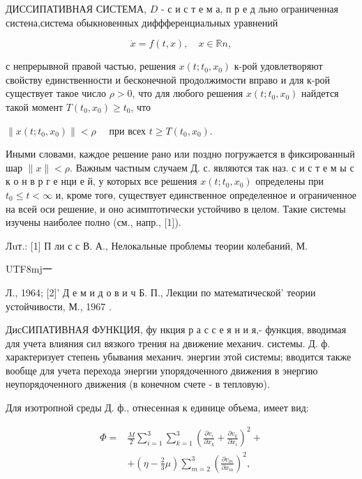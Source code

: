 \documentclass[10pt]{article}
\begin{document}
ДИССИПАТИВНАЯ СИСТЕМА, $D$ - с и с т е м а, п р е д льно ограниченная систена,система обыкновенных диффференциальных уравнений



\[

\dot{x}=f(t, x), \quad x \in \mathbb{R} n,

\]



с непрерывной правой частью, решения $x\left(t ; t_{0}, x_{0}\right)$ к-рой удовлетворяют свойству единственности и бесконечной продолжимости вправо и для к-рой существует такое число $\rho>0$, что для любого решения $x\left(t ; t_{0}, x_{0}\right)$ найдется такой момент $T\left(t_{0}, x_{0}\right) \geqslant t_{0}$, что



$\left\|x\left(t ; t_{0}, x_{0}\right)\right\|<\rho \quad$ при всех $t \geqslant T\left(t_{0}, x_{0}\right)$.



Иными словами, каждое решение рано или поздно погружается в фиксированный шар $\|x\|<\rho$. Важным частным случаем Д. с. являются так наз. с и с т е м ы с к о н в р г е нци е й, у которых все решения $x\left(t ; t_{0}, x_{0}\right)$ определены при $t_{0} \leqslant t<\infty$ и, кроме тогө, существует единственное определенное и ограниченное на всей оси решение, и оно асимптотически устойчиво в целом. Такие системы изучены наиболее полно (см., напр., [1]).



Лuт.: [1] П ли с с В. А., Нелокальные проблемы теории колебаний, М. \begin{CJK}{UTF8}{mj}一\end{CJK}Л., 1964; [2]' Д е м и д о в и ч Б. П., Лекции по математической' теории устойчивости, М., 1967 .



ДисСИПАТИВНАЯ ФУНКЦИЯ, фу нкция р а с с е я н и я,- функция, вводимая для учета влияния сил вязкого трения на движение механич. системы. Д. ф. характеризует степень убывания механич. энергии этой системы; вводится также вообще для учета перехода энергии упорядоченного движения в энергию неупорядоченного движения (в конечном счете - в тепловую).



Для изотропной среды Д. ф., отнесенная к единице объема, имеет вид:



\[

\begin{aligned}

\Phi= & \frac{M}{2} \sum_{i=1}^{3} \sum_{k=1}^{3}\left(\frac{\partial v_{i}}{\partial x_{k}}+\frac{\partial v_{k}}{\partial x_{i}}\right)^{2}+ \\

& +\left(\eta-\frac{2}{3} \mu\right) \sum_{m=2}^{3}\left(\frac{\partial v_{m}}{\partial x_{m}}\right)^{2},

\end{aligned}

\]
\end{document}
